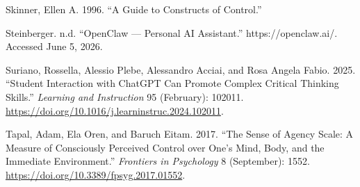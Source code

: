 \documentclass[
  letterpaper,
  DIV=11,
  numbers=noendperiod]{scrartcl}
\newlength{\cslhangindent}
\newenvironment{CSLReferences}[2] %
 {\begin{list}{}{%
  \setlength{\itemindent}{0pt}
  \setlength{\leftmargin}{0pt}
  \setlength{\parsep}{0pt}
  \ifodd #1
   \setlength{\leftmargin}{\cslhangindent}
   \setlength{\itemindent}{-1\cslhangindent}
  \fi
  \setlength{\itemsep}{#2\baselineskip}}}
 {\end{list}}
\begin{document}
\begin{CSLReferences}{1}{0}
Skinner, Ellen A. 1996. {``A {Guide} to {Constructs} of {Control}.''}

Steinberger. n.d. {``{OpenClaw} --- {Personal AI Assistant}.''}
https://openclaw.ai/. Accessed June 5, 2026.

Suriano, Rossella, Alessio Plebe, Alessandro Acciai, and Rosa Angela
Fabio. 2025. {``Student Interaction with {ChatGPT} Can Promote Complex
Critical Thinking Skills.''} \emph{Learning and Instruction} 95
(February): 102011.
\url{https://doi.org/10.1016/j.learninstruc.2024.102011}.

Tapal, Adam, Ela Oren, and Baruch Eitam. 2017. {``The Sense of Agency
Scale: A Measure of Consciously Perceived Control over One's Mind, Body,
and the Immediate Environment.''} \emph{Frontiers in Psychology} 8
(September): 1552. \url{https://doi.org/10.3389/fpsyg.2017.01552}.

\end{CSLReferences}
\end{document}

